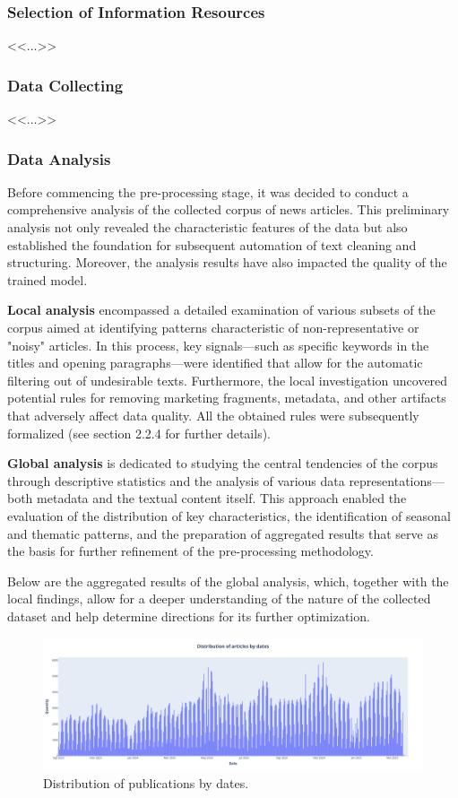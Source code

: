 \subsubsection{Selection of Information Resources}
<<...>>

\subsubsection{Data Collecting}
<<...>>

\subsubsection{Data Analysis}
Before commencing the pre-processing stage, it was decided to conduct a comprehensive analysis of the collected corpus of news articles.
This preliminary analysis not only revealed the characteristic features of the data but also established the foundation for subsequent
automation of text cleaning and structuring. Moreover, the analysis results have also impacted the quality of the trained model.

\textbf{Local analysis} encompassed a detailed examination of various subsets of the corpus aimed at identifying patterns characteristic
of non-representative or "noisy" articles. In this process, key signals—such as specific keywords in the titles and opening paragraphs—were
identified that allow for the automatic filtering out of undesirable texts. Furthermore, the local investigation uncovered potential
rules for removing marketing fragments, metadata, and other artifacts that adversely affect data quality.
All the obtained rules were subsequently formalized (see section 2.2.4 for further details).

\textbf{Global analysis} is dedicated to studying the central tendencies of the corpus through descriptive statistics and the analysis
of various data representations—both metadata and the textual content itself. This approach enabled the evaluation of the distribution
of key characteristics, the identification of seasonal and thematic patterns, and the preparation of aggregated results that serve
as the basis for further refinement of the pre-processing methodology.

Below are the aggregated results of the global analysis, which, together with the local findings, allow for a deeper understanding
of the nature of the collected dataset and help determine directions for its further optimization.

\begin{figure}[H]
    \centering
    \includegraphics[width=1\linewidth]{img/articles_dist_by_dates.png}
    \caption{Distribution of publications by dates.}
    \label{fig:dist_by_dates}
\end{figure}

